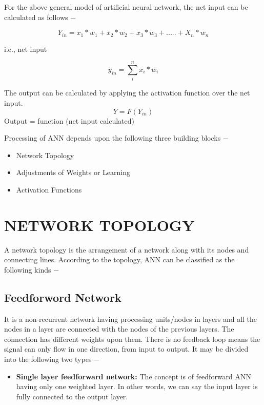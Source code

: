 \documentclass{report}
\begin{document}
For the above general model of artificial neural network, the net input can be calculated as follows −

\[Y_{in} = x_{1}*w_{1} + x_{2}*w_{2} + x_{3}*w_{3} + .....+ X_{n}*w_{n}\]

i.e., net input

\[y_{in} = \sum_{i}^{n} x_{i}*w_{i}\]

The output can be calculated by applying the activation function over the net input.
\[Y = F(Y_{in})\]
Output = function (net input calculated)

Processing of ANN depends upon the following three building blocks −

\begin{itemize}
\item Network Topology
\item Adjustments of Weights or Learning
\item Activation Functions

\end{itemize}

\section{NETWORK TOPOLOGY}
A network topology is the arrangement of a network along with its nodes and connecting lines. According to the topology, ANN can be classified as the following kinds −

\subsection{Feedforword Network}
It is a non-recurrent network having processing units/nodes in layers and all the nodes in a layer are connected with the nodes of the previous layers. The connection has different weights upon them. There is no feedback loop means the signal can only flow in one direction, from input to output. It may be divided into the following two types −

\begin{itemize}
\item \textbf{Single layer feedforward network: } The concept is of feedforward ANN having only one weighted layer. In other words, we can say the input layer is fully connected to the output layer.

\end{itemize}
\end{document}
